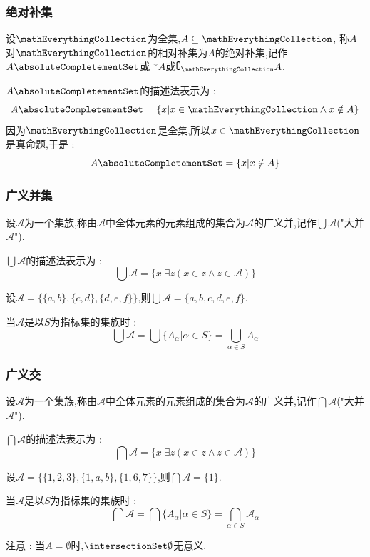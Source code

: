 {{{  \subsubsection{绝对补集}{
    设$\mathEverythingCollection$为全集,$A \subseteq \mathEverythingCollection$, 称$A$对$\mathEverythingCollection$的相对补集为$A$的绝对补集,记作$A\absoluteCompletementSet$或${~}^\sim A$或$\complement_{\mathEverythingCollection} A$.

    $A\absoluteCompletementSet$的描述法表示为 : $$
      A\absoluteCompletementSet = \{x | x \in \mathEverythingCollection \land x \notin A\}
    $$
    因为$\mathEverythingCollection$是全集,所以$x \in \mathEverythingCollection$是真命题,于是 : $$
      A\absoluteCompletementSet = \{x | x \notin A\}
    $$
  }%

  \subsubsection{广义并集}{
    设$\mathcal{A}$为一个集族,称由$\mathcal{A}$中全体元素的元素组成的集合为$\mathcal{A}$的广义并,记作$\bigcup \mathcal{A}$("大并$\mathcal{A}$").

    $\bigcup \mathcal{A}$的描述法表示为 : $$
      \bigcup\mathcal{A} = \{x | \exists z (x \in z \land z \in \mathcal{A})\}
    $$

    设$\mathcal{A} = \{\{a,b\},\{c,d\},\{d,e,f\}\}$,则$\bigcup \mathcal{A} = \{a,b,c,d,e,f\}$.

    当$\mathcal{A}$是以$S$为指标集的集族时 : $$
      \bigcup\mathcal{A} = \bigcup\{A_\alpha | \alpha \in S\} = \bigcup_{\alpha \in S}A_\alpha
    $$
  }%

  \subsubsection{广义交}{
    设$\mathcal{A}$为一个集族,称由$\mathcal{A}$中全体元素的元素组成的集合为$\mathcal{A}$的广义并,记作$\bigcap \mathcal{A}$("大并$\mathcal{A}$").

    $\bigcap \mathcal{A}$的描述法表示为 : $$
      \bigcap\mathcal{A} = \{x | \exists z (x \in z \land z \in \mathcal{A})\}
    $$

    设$\mathcal{A} = \{\{1,2,3\},\{1,a,b\},\{1,6,7\}\}$,则$\bigcap \mathcal{A} = \{1\}$.

    当$\mathcal{A}$是以$S$为指标集的集族时 : $$
      \bigcap\mathcal{A} = \bigcap\{A_\alpha | \alpha \in S\} = \bigcap_{\alpha \in S}\mathcal{A}_\alpha
    $$

    注意 : 当$A = \emptyset$时,$\intersectionSet \emptyset$无意义.
  }%

}}}
